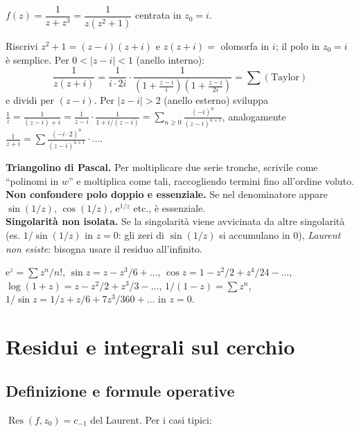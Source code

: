 \documentclass[11pt,a4paper,openany]{book}
\theoremstyle{definition}
\newcommand{\eu}{\mathrm{e}}
\DeclareMathOperator{\Res}{Res}
\begin{document}
\begin{esempio}
$f(z)=\dfrac{1}{z+z^3}=\dfrac{1}{z(z^2+1)}$ centrata in $z_0=i$.

Riscrivi $z^2+1=(z-i)(z+i)$ e $z(z+i)=$ olomorfa in $i$; il polo in $z_0=i$ \`e semplice. Per $0<|z-i|<1$ (anello interno):
$$\frac{1}{z(z+i)}=\frac{1}{i\cdot 2i}\cdot\frac{1}{(1+\frac{z-i}{i})(1+\frac{z-i}{2i})}=\sum (\text{Taylor})$$
e dividi per $(z-i)$. Per $|z-i|>2$ (anello esterno) sviluppa
$\frac{1}{z}=\frac{1}{(z-i)+i}=\frac{1}{z-i}\cdot\frac{1}{1+i/(z-i)}=\sum_{n\ge 0}\frac{(-i)^n}{(z-i)^{n+1}}$,
analogamente $\frac{1}{z+i}=\sum\frac{(-i\cdot 2)^n}{(z-i)^{n+1}}\cdot\dots$.
\end{esempio}

\begin{trucco}
\textbf{Triangolino di Pascal.} Per moltiplicare due serie tronche, scrivile come ``polinomi in $w$'' e moltiplica come tali, raccogliendo termini fino all'ordine voluto.\\
\textbf{Non confondere polo doppio e essenziale.} Se nel denominatore appare $\sin(1/z)$, $\cos(1/z)$, $\eu^{1/z}$ etc., \`e essenziale.\\
\textbf{Singolarit\`a non isolata.} Se la singolarit\`a viene avvicinata da altre singolarit\`a (es. $1/\sin(1/z)$ in $z=0$: gli zeri di $\sin(1/z)$ si accumulano in $0$), \emph{Laurent non esiste}: bisogna usare il residuo all'infinito.
\end{trucco}

\begin{formulario}
$\eu^z=\sum z^n/n!$, $\sin z=z-z^3/6+\dots$, $\cos z=1-z^2/2+z^4/24-\dots$, $\log(1+z)=z-z^2/2+z^3/3-\dots$, $1/(1-z)=\sum z^n$, $1/\sin z=1/z+z/6+7z^3/360+\dots$ in $z=0$.
\end{formulario}

\chapter{Residui e integrali sul cerchio}\label{ch:residui}

\section{Definizione e formule operative}
$\Res(f,z_0)=c_{-1}$ del Laurent. Per i casi tipici:
\end{document}
